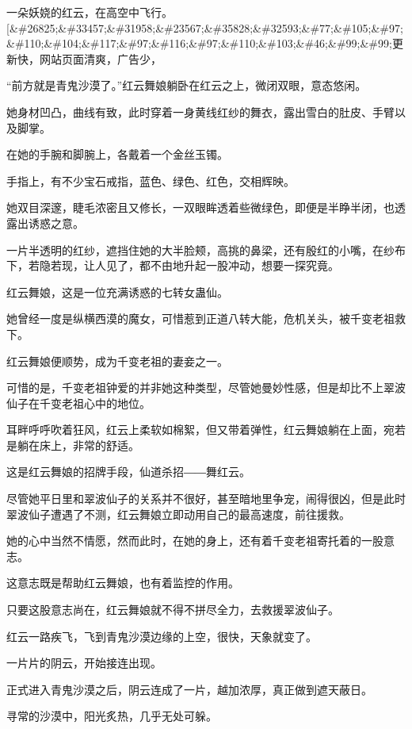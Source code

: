 
\begin{this_body}

一朵妖娆的红云，在高空中飞行。[\&\#26825;\&\#33457;\&\#31958;\&\#23567;\&\#35828;\&\#32593;\&\#77;\&\#105;\&\#97;\&\#110;\&\#104;\&\#117;\&\#97;\&\#116;\&\#97;\&\#110;\&\#103;\&\#46;\&\#99;\&\#99;更新快，网站页面清爽，广告少，

“前方就是青鬼沙漠了。”红云舞娘躺卧在红云之上，微闭双眼，意态悠闲。

她身材凹凸，曲线有致，此时穿着一身黄线红纱的舞衣，露出雪白的肚皮、手臂以及脚掌。

在她的手腕和脚腕上，各戴着一个金丝玉镯。

手指上，有不少宝石戒指，蓝色、绿色、红色，交相辉映。

她双目深邃，睫毛浓密且又修长，一双眼眸透着些微绿色，即便是半睁半闭，也透露出诱惑之意。

一片半透明的红纱，遮挡住她的大半脸颊，高挑的鼻梁，还有殷红的小嘴，在纱布下，若隐若现，让人见了，都不由地升起一股冲动，想要一探究竟。

红云舞娘，这是一位充满诱惑的七转女蛊仙。

她曾经一度是纵横西漠的魔女，可惜惹到正道八转大能，危机关头，被千变老祖救下。

红云舞娘便顺势，成为千变老祖的妻妾之一。

可惜的是，千变老祖钟爱的并非她这种类型，尽管她曼妙性感，但是却比不上翠波仙子在千变老祖心中的地位。

耳畔呼呼吹着狂风，红云上柔软如棉絮，但又带着弹性，红云舞娘躺在上面，宛若是躺在床上，非常的舒适。

这是红云舞娘的招牌手段，仙道杀招――舞红云。

尽管她平日里和翠波仙子的关系并不很好，甚至暗地里争宠，闹得很凶，但是此时翠波仙子遭遇了不测，红云舞娘立即动用自己的最高速度，前往援救。

她的心中当然不情愿，然而此时，在她的身上，还有着千变老祖寄托着的一股意志。

这意志既是帮助红云舞娘，也有着监控的作用。

只要这股意志尚在，红云舞娘就不得不拼尽全力，去救援翠波仙子。

红云一路疾飞，飞到青鬼沙漠边缘的上空，很快，天象就变了。

一片片的阴云，开始接连出现。

正式进入青鬼沙漠之后，阴云连成了一片，越加浓厚，真正做到遮天蔽日。

寻常的沙漠中，阳光炙热，几乎无处可躲。


\end{this_body}
